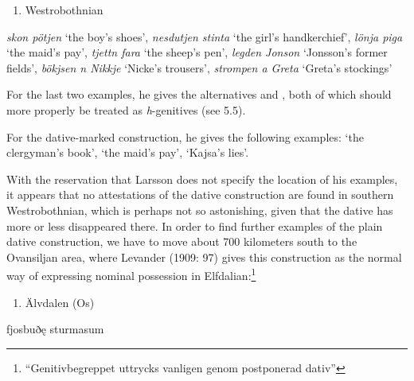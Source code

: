 \begin{enumerate} %
\item 
Westrobothnian

\end{enumerate} %
\textit{skon pötjen} ‘the boy’s shoes’, \textit{nesdutjen stinta} ‘the girl’s handkerchief’, \textit{lönja piga} ‘the maid’s pay’, \textit{tjettn fara} ‘the sheep’s pen’, \textit{legden Jonson} ‘Jonsson’s former fields’, \textit{bökjsen n Nikkje} ‘Nicke’s trousers’, \textit{strompen a Greta} ‘Greta’s stockings’

For the last two examples, he gives the alternatives  and , both of which should more properly be treated as \textit{h}{}-genitives (see 5.5).

For the dative-marked construction, he gives the following examples:  ‘the clergyman’s book’,  ‘the maid’s pay’, ‘Kajsa’s lies’. 

With the reservation that Larsson does not specify the location of his examples, it appears that no attestations of the dative construction are found in southern Westrobothnian, which is perhaps not so astonishing, given that the dative has more or less disappeared there. In order to find further examples of the plain dative construction, we have to move about 700 kilometers south to the Ovansiljan area, where Levander (1909: 97) gives this construction as the normal way of expressing nominal possession in Elfdalian:\footnote{ “Genitivbegreppet uttrycks vanligen genom postponerad dativ”}

\begin{enumerate} %
\item 
Älvdalen (Os)

\end{enumerate} %
\ea\label{}
\gll fjosbuðę  sturmasum\\


